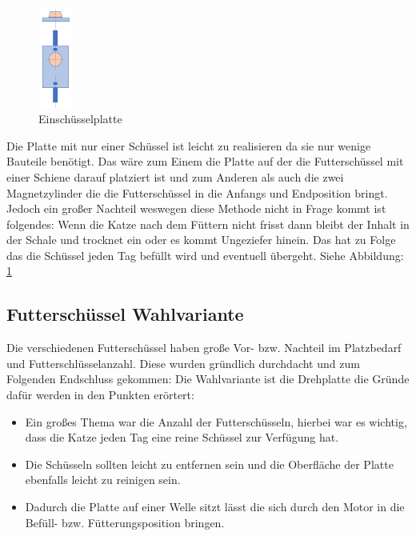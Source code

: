\begin{figure}
\vspace{-20pt}
  \begin{center}
    \includegraphics[width=0.10\textwidth]{Bilder/Powerpoint/Einschuessel_platte}
  \end{center}
  \caption{Einschüsselplatte}
  \label{Schüssel Eins}
  \vspace{-10pt}
\end{figure}

Die Platte mit nur einer Schüssel ist leicht zu realisieren da sie nur wenige Bauteile benötigt. Das wäre zum Einem die Platte auf der die Futterschüssel mit einer Schiene darauf platziert ist und zum Anderen als auch die zwei Magnetzylinder die die Futterschüssel in die Anfangs und Endposition bringt. Jedoch ein großer Nachteil weswegen diese Methode nicht in Frage kommt ist folgendes: Wenn die Katze nach dem Füttern nicht frisst dann bleibt der Inhalt in der Schale und trocknet ein oder es kommt Ungeziefer hinein. Das hat zu Folge das die Schüssel jeden Tag befüllt wird und eventuell übergeht. Siehe Abbildung: \ref{Schüssel Eins} 

\subsection{Futterschüssel Wahlvariante}

Die verschiedenen Futterschüssel haben große Vor- bzw. Nachteil im Platzbedarf und Futterschlüsselanzahl. Diese wurden gründlich durchdacht und zum Folgenden Endschluss gekommen: Die Wahlvariante ist die Drehplatte die Gründe dafür werden in den Punkten erörtert: 

\begin{itemize}
\item Ein großes Thema war die Anzahl der Futterschüsseln, hierbei war es wichtig, dass die Katze jeden Tag eine reine Schüssel zur Verfügung hat.
\item Die Schüsseln sollten leicht zu entfernen sein und die Oberfläche der Platte ebenfalls leicht zu reinigen sein.
\item Dadurch die Platte auf einer Welle sitzt lässt die sich durch den Motor in die Befüll- bzw. Fütterungsposition bringen.
\end{itemize} 

